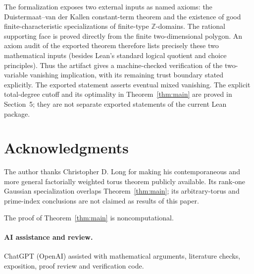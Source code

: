 \documentclass[11pt]{article}
\newcommand{\Z}{\mathbb Z}
\begin{document}
The formalization exposes two external inputs as named axioms: the
Duistermaat--van der Kallen constant-term theorem and the existence of good
finite-characteristic specializations of finite-type \(\Z\)-domains.  The
rational supporting face is proved directly from the finite
two-dimensional polygon.  An axiom audit of the exported theorem therefore
lists precisely these two mathematical inputs (besides Lean's standard
logical quotient and choice principles).  Thus the artifact gives a
machine-checked verification of the two-variable vanishing implication,
with its remaining trust boundary stated explicitly.  The exported
statement asserts eventual mixed vanishing.  The explicit total-degree
cutoff and its optimality in Theorem~\ref{thm:main} are proved in Section~5;
they are not separate exported statements of the current Lean package.

\section*{Acknowledgments}

The author thanks Christopher D. Long for making his contemporaneous and
more general factorially weighted torus theorem publicly available.  Its
rank-one Gaussian specialization overlaps Theorem~\ref{thm:main}; its
arbitrary-torus and prime-index conclusions are not claimed as results of
this paper.

The proof of Theorem~\ref{thm:main} is noncomputational.

\paragraph{AI assistance and review.}
ChatGPT (OpenAI) assisted with mathematical arguments, literature checks,
exposition, proof review and verification code.



\end{document}
